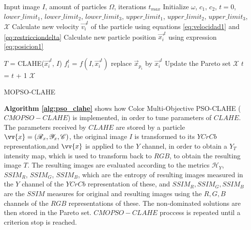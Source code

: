 \documentclass[11pt]{article}
\begin{document}
\begin{algorithm}[H]
    \scriptsize
    \begin{algorithmic}[1]
        \Require Input image $I$, amount of particles $\Omega$, iterations $t_{max}$
        \State Initialize $\omega$, $c_1$, $c_2$, $t=0$, $lower\_limit_1$, $lower\_limit_2$, $lower\_limit_3$, $upper\_limit_1$, $upper\_limit_2$, $upper\_limit_3$, $\mathscr{X}$
                \State Calculate new velocity $\overrightarrow{v_i}^t$ of the particle  using equations \eqref{eq:velocidad1} and \eqref{eq:restricciondelta}
                \State Calculate new particle position $\overrightarrow{x_i}^t$ using expression \eqref{eq:posicion1}

                \State ${T}$ = CLAHE(${\overrightarrow{x_i}^t}$, ${I}$)
                \State ${f^t_i}$ = $f(I, \overrightarrow{x_i}^t)$%
                    \State replace $\overrightarrow{x}_{p_i}$ by $\overrightarrow{x_i}^t$
                \EndIf
                    \State Update the Pareto set $\mathscr{X}$
                \EndIf
                \State $t$ = $t$ + 1
            \EndFor
        \EndWhile
    \Ensure $\mathscr{X}$
    \end{algorithmic}
    \caption{MOPSO-CLAHE}
    \label{alg:pso_clahe}
\end{algorithm}

\textbf{Algorithm \ref{alg:pso_clahe}} shows how Color Multi-Objective PSO-CLAHE ($CMOPSO-CLAHE$) is implemented, in order to tune parameters of $CLAHE$. The parameters received by $CLAHE$ are stored by a particle $\vv{x}=(\mathscr{R}_x,\mathscr{Y}_x,\mathscr{C})$, the original image $I$ is transformed to its $YCrCb$ representation,and $\vv{x}$ is applied to the $Y$ channel, in order to obtain a $Y_T$ intensity map, which is used to transform back to $RGB$, to obtain the resulting image $T$. The resulting images are evaluated according to the metrics $\mathscr{H}_Y$, $SSIM_R$, $SSIM_G$, $SSIM_B$, which are the entropy of resulting images measured in the $Y$ channel of the $YCrCb$ representation of these, and $SSIM_R,SSIM_G,SSIM_B$ are the $SSIM$ measures for original and resulting images using the $R,G,B$ channels of the $RGB$ representations of these. The non-dominated solutions are then stored in the Pareto set. $CMOPSO-CLAHE$ proccess is repeated until a criterion stop is reached.
\end{document}
